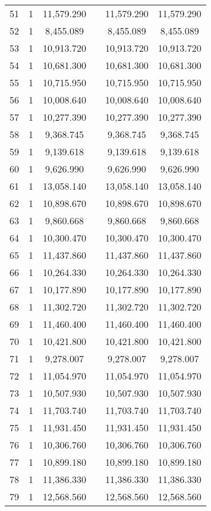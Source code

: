\begin{table}[!htbp]
\begin{tabular}{@{\extracolsep{5pt}}lccccc}
51 & 1 & 11,579.290 &  & 11,579.290 & 11,579.290 \\ 
52 & 1 & 8,455.089 &  & 8,455.089 & 8,455.089 \\ 
53 & 1 & 10,913.720 &  & 10,913.720 & 10,913.720 \\ 
54 & 1 & 10,681.300 &  & 10,681.300 & 10,681.300 \\ 
55 & 1 & 10,715.950 &  & 10,715.950 & 10,715.950 \\ 
56 & 1 & 10,008.640 &  & 10,008.640 & 10,008.640 \\ 
57 & 1 & 10,277.390 &  & 10,277.390 & 10,277.390 \\ 
58 & 1 & 9,368.745 &  & 9,368.745 & 9,368.745 \\ 
59 & 1 & 9,139.618 &  & 9,139.618 & 9,139.618 \\ 
60 & 1 & 9,626.990 &  & 9,626.990 & 9,626.990 \\ 
61 & 1 & 13,058.140 &  & 13,058.140 & 13,058.140 \\ 
62 & 1 & 10,898.670 &  & 10,898.670 & 10,898.670 \\ 
63 & 1 & 9,860.668 &  & 9,860.668 & 9,860.668 \\ 
64 & 1 & 10,300.470 &  & 10,300.470 & 10,300.470 \\ 
65 & 1 & 11,437.860 &  & 11,437.860 & 11,437.860 \\ 
66 & 1 & 10,264.330 &  & 10,264.330 & 10,264.330 \\ 
67 & 1 & 10,177.890 &  & 10,177.890 & 10,177.890 \\ 
68 & 1 & 11,302.720 &  & 11,302.720 & 11,302.720 \\ 
69 & 1 & 11,460.400 &  & 11,460.400 & 11,460.400 \\ 
70 & 1 & 10,421.800 &  & 10,421.800 & 10,421.800 \\ 
71 & 1 & 9,278.007 &  & 9,278.007 & 9,278.007 \\ 
72 & 1 & 11,054.970 &  & 11,054.970 & 11,054.970 \\ 
73 & 1 & 10,507.930 &  & 10,507.930 & 10,507.930 \\ 
74 & 1 & 11,703.740 &  & 11,703.740 & 11,703.740 \\ 
75 & 1 & 11,931.450 &  & 11,931.450 & 11,931.450 \\ 
76 & 1 & 10,306.760 &  & 10,306.760 & 10,306.760 \\ 
77 & 1 & 10,899.180 &  & 10,899.180 & 10,899.180 \\ 
78 & 1 & 11,386.330 &  & 11,386.330 & 11,386.330 \\ 
79 & 1 & 12,568.560 &  & 12,568.560 & 12,568.560 \\ 

\end{tabular}
\end{table}
